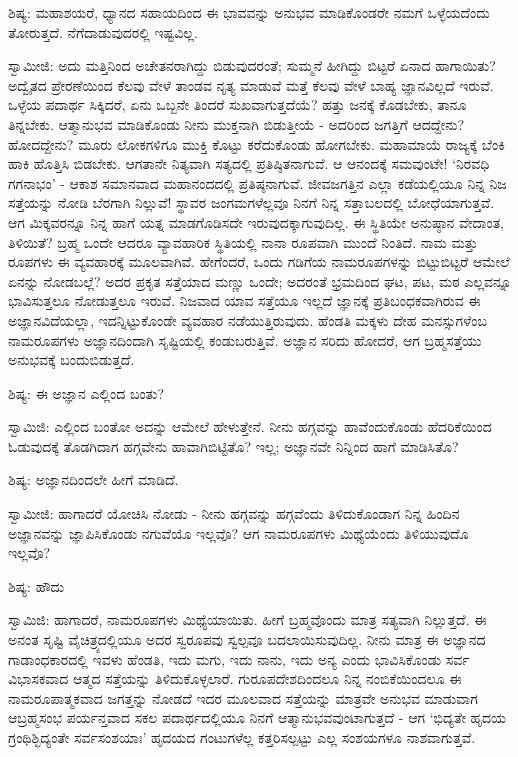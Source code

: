 ಶಿಷ್ಯ: ಮಹಾಶಯರೆ, ಧ್ಯಾನದ ಸಹಾಯದಿಂದ ಈ ಭಾವವನ್ನು ಅನುಭವ ಮಾಡಿಕೊಂಡರೇ ನಮಗೆ ಒಳ್ಳೆಯದೆಂದು ತೋರುತ್ತದೆ. ನೆಗೆದಾಡುವುದರಲ್ಲಿ ಇಷ್ಟವಿಲ್ಲ.

ಸ್ವಾಮೀಜಿ: ಅದು ಮತ್ತಿನಿಂದ ಅಚೇತನರಾಗಿದ್ದು ಬಿಡುವುದರಂತೆ; ಸುಮ್ಮನೆ ಹೀಗಿದ್ದು ಬಿಟ್ಟರೆ ಏನಾದ ಹಾಗಾಯಿತು? ಅದ್ವೈತದ ಪ್ರೇರಣೆಯಿಂದ ಕೆಲವು ವೇಳೆ ತಾಂಡವ ನೃತ್ಯ ಮಾಡುವೆ ಮತ್ತೆ ಕೆಲವು ವೇಳೆ ಬಾಹ್ಯ ಜ್ಞಾನವಿಲ್ಲದೆ ಇರುವೆ. ಒಳ್ಳೆಯ ಪದಾರ್ಥ ಸಿಕ್ಕಿದರೆ, ಏನು ಒಬ್ಬನೇ ತಿಂದರೆ ಸುಖವಾಗುತ್ತದೆಯೆ? ಹತ್ತು ಜನಕ್ಕೆ ಕೊಡಬೇಕು, ತಾನೂ ತಿನ್ನಬೇಕು. ಆತ್ಮಾನುಭವ ಮಾಡಿಕೊಂಡು ನೀನು ಮುಕ್ತನಾಗಿ ಬಿಡುತ್ತೀಯೆ - ಅದರಿಂದ ಜಗತ್ತಿಗೆ ಆದದ್ದೇನು? ಹೋದದ್ದೇನು? ಮೂರು ಲೋಕಗಳಿಗೂ ಮುಕ್ತಿ ಕೊಟ್ಟು ಕರೆದುಕೊಂಡು ಹೋಗಬೇಕು. ಮಹಾಮಾಯೆ ರಾಜ್ಯಕ್ಕೆ ಬೆಂಕಿ ಹಾಕಿ ಹೊತ್ತಿಸಿ ಬಿಡಬೇಕು. ಆಗತಾನೇ ನಿತ್ಯವಾಗಿ ಸತ್ಯದಲ್ಲಿ ಪ್ರತಿಷ್ಠಿತನಾಗುವೆ. ಆ ಆನಂದಕ್ಕೆ ಸಮವುಂಟೇ! ‘ನಿರವಧಿ ಗಗನಾಭಂ’ - ಆಕಾಶ ಸಮಾನವಾದ ಮಹಾನಂದದಲ್ಲಿ ಪ್ರತಿಷ್ಠನಾಗುವೆ. ಜೀವಜಗತ್ತಿನ ಎಲ್ಲಾ ಕಡೆಯಲ್ಲಿಯೂ ನಿನ್ನ ನಿಜ ಸತ್ತೆಯನ್ನು ನೋಡಿ ಬೆರಗಾಗಿ ನಿಲ್ಲುವೆ! ಸ್ಥಾವರ ಜಂಗಮಗಳೆಲ್ಲವೂ ನಿನಗೆ ನಿನ್ನ ಸತ್ತಾಬಲದಲ್ಲಿ ಬೋಧೆಯಾಗುತ್ತವೆ. ಆಗ ಮಿಕ್ಕವರನ್ನೂ ನಿನ್ನ ಹಾಗೆ ಯತ್ನ ಮಾಡಗೊಡಿಸದೇ ಇರುವುದಕ್ಕಾಗುವುದಿಲ್ಲ. ಈ ಸ್ಥಿತಿಯೇ ಅನುಷ್ಠಾನ ವೇದಾಂತ, ತಿಳಿಯಿತೆ? ಬ್ರಹ್ಮ ಒಂದೇ ಆದರೂ ವ್ಯಾವಹಾರಿಕ ಸ್ಥಿತಿಯಲ್ಲಿ ನಾನಾ ರೂಪವಾಗಿ ಮುಂದೆ ನಿಂತಿದೆ. ನಾಮ ಮತ್ತು ರೂಪಗಳು ಈ ವ್ಯವಹಾರಕ್ಕೆ ಮೂಲವಾಗಿವೆ. ಹೇಗೆಂದರೆ, ಒಂದು ಗಡಿಗೆಯ ನಾಮರೂಪಗಳನ್ನು ಬಿಟ್ಟುಬಿಟ್ಟರೆ ಆಮೇಲೆ ಏನನ್ನು ನೋಡಬಲ್ಲೆ? ಅದರ ಪ್ರಕೃತ ಸತ್ತೆಯಾದ ಮಣ್ಣು ಒಂದೇ; ಅದರಂತೆ ಭ್ರಮದಿಂದ ಘಟ, ಪಟ, ಮಠ ಎಲ್ಲವನ್ನೂ ಭಾವಿಸುತ್ತಲೂ ನೋಡುತ್ತಲೂ ಇರುವೆ. ನಿಜವಾದ ಯಾವ ಸತ್ತೆಯೂ ಇಲ್ಲದೆ ಜ್ಞಾನಕ್ಕೆ ಪ್ರತಿಬಂಧಕವಾಗಿರುವ ಈ ಅಜ್ಞಾನವಿದೆಯಲ್ಲಾ, ಇದನ್ನಿಟ್ಟುಕೊಂಡೇ ವ್ಯವಹಾರ ನಡೆಯುತ್ತಿರುವುದು. ಹೆಂಡತಿ ಮಕ್ಕಳು ದೇಹ ಮನಸ್ಸುಗಳೆಂಬ ನಾಮರೂಪಗಳು ಅಜ್ಞಾನದಿಂದಾಗಿ ಸೃಷ್ಟಿಯಲ್ಲಿ ಕಂಡುಬರುತ್ತಿವೆ. ಅಜ್ಞಾನ ಸರಿದು ಹೋದರೆ, ಆಗ ಬ್ರಹ್ಮಸತ್ತೆಯು ಅನುಭವಕ್ಕೆ ಬಂದುಬಿಡುತ್ತದೆ.

ಶಿಷ್ಯ: ಈ ಅಜ್ಞಾನ ಎಲ್ಲಿಂದ ಬಂತು?

ಸ್ವಾಮಿಜಿ: ಎಲ್ಲಿಂದ ಬಂತೋ ಅದನ್ನು ಆಮೇಲೆ ಹೇಳುತ್ತೇನೆ. ನೀನು ಹಗ್ಗವನ್ನು ಹಾವೆಂದುಕೊಂಡು ಹೆದರಿಕೆಯಿಂದ ಓಡುವುದಕ್ಕೆ ತೊಡಗಿದಾಗ ಹಗ್ಗವೇನು ಹಾವಾಗಿಬಿಟ್ಟಿತೊ? ಇಲ್ಲ; ಅಜ್ಞಾನವೇ ನಿನ್ನಿಂದ ಹಾಗೆ ಮಾಡಿಸಿತೊ?

ಶಿಷ್ಯ: ಅಜ್ಞಾನದಿಂದಲೇ ಹೀಗೆ ಮಾಡಿದೆ.

ಸ್ವಾಮೀಜಿ: ಹಾಗಾದರೆ ಯೋಚಿಸಿ ನೋಡು - ನೀನು ಹಗ್ಗವನ್ನು ಹಗ್ಗವೆಂದು ತಿಳಿದುಕೊಂಡಾಗ ನಿನ್ನ ಹಿಂದಿನ ಅಜ್ಞಾನವನ್ನು ಜ್ಞಾಪಿಸಿಕೊಂಡು ನಗುವೆಯೊ ಇಲ್ಲವೊ? ಆಗ ನಾಮರೂಪಗಳು ಮಿಥ್ಯೆಯೆಂದು ತಿಳಿಯುವುದೊ ಇಲ್ಲವೊ?

ಶಿಷ್ಯ: ಹೌದು

ಸ್ವಾಮಿಜಿ: ಹಾಗಾದರೆ, ನಾಮರೂಪಗಳು ಮಿಥ್ಯೆಯಾಯಿತು. ಹೀಗೆ ಬ್ರಹ್ಮವೊಂದು ಮಾತ್ರ ಸತ್ಯವಾಗಿ ನಿಲ್ಲುತ್ತದೆ. ಈ ಅನಂತ ಸೃಷ್ಟಿ ವೈಚಿತ್ರ್ಯದಲ್ಲಿಯೂ ಅದರ ಸ್ವರೂಪವು ಸ್ವಲ್ಪವೂ ಬದಲಾಯಿಸುವುದಿಲ್ಲ. ನೀನು ಮಾತ್ರ ಈ ಅಜ್ಞಾನದ ಗಾಡಾಂಧಕಾರದಲ್ಲಿ ಇವಳು ಹೆಂಡತಿ, ಇದು ಮಗು, ಇದು ನಾನು, ಇದು ಅನ್ಯ ಎಂದು ಭಾವಿಸಿಕೊಂಡು ಸರ್ವ ವಿಭಾಸಕವಾದ ಆತ್ಮದ ಸತ್ತೆಯನ್ನು ತಿಳಿದುಕೊಳ್ಳಲಾರೆ. ಗುರೂಪದೇಶದಿಂದಲೂ ನಿನ್ನ ನಂಬಿಕೆಯಿಂದಲೂ ಈ ನಾಮರೂಪಾತ್ಮಕವಾದ ಜಗತ್ತನ್ನು ನೋಡದೆ ಇದರ ಮೂಲವಾದ ಸತ್ತೆಯನ್ನು ಮಾತ್ರವೇ ಅನುಭವ ಮಾಡುವಾಗ ಆಬ್ರಹ್ಮಸಂಭ ಪರ್ಯನ್ತವಾದ ಸಕಲ ಪದಾರ್ಥದಲ್ಲಿಯೂ ನಿನಗೆ ಆತ್ಮಾನುಭವವುಂಟಾಗುತ್ತದೆ - ಆಗ ‘ಭಿದ್ಯತೇ ಹೃದಯ ಗ್ರಂಥಿಶ್ಛಿದ್ಯಂತೇ ಸರ್ವಸಂಶಯಾಃ’ ಹೃದಯದ ಗಂಟುಗಳೆಲ್ಲ ಕತ್ತರಿಸಲ್ಪಟ್ಟು ಎಲ್ಲ ಸಂಶಯಗಳೂ ನಾಶವಾಗುತ್ತವೆ.

